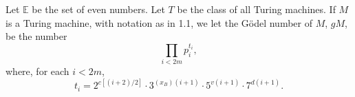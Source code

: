 Let $\mathbb{E}$ be the set of even numbers. Let $T$ be the class of all Turing machines. If $M$ is a Turing machine, with notation as in 1.1, we let the G\"{o}del number of $M$, $gM$, be the number
$$\prod_{i < 2m} p_i^{t_i},$$
where, for each $i < 2m$,
$$t_i = 2^{c[(i+2)/2]} \cdot 3^{(x_B)(i+1)} \cdot 5^{v(i+1)} \cdot 7^{d(i+1)}.$$
